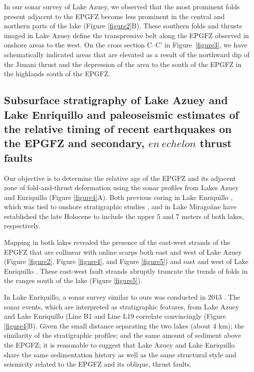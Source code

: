 \documentclass[linenumbers,draft]{agujournal}
\begin{document}
In our sonar survey of Lake Azuey, we observed that the most prominent folds present adjacent to the EPGFZ become less prominent in the central and northern parts of the lake (Figure \ref{figure2}B). These southern folds and thrusts imaged in Lake Azuey define the transpressive belt along the EPGFZ observed in onshore areas to the west. On the cross section C--C' in Figure~\ref{figure3}, we have schematically indicated areas that are elevated as a result of the northward dip of the Jimani thrust and the depression of the area to the south of the EPGFZ in the highlands south of the EPGFZ.

\subsection{Subsurface stratigraphy of Lake Azuey and Lake Enriquillo and paleoseismic estimates of the relative timing of recent earthquakes on the EPGFZ and secondary, $en~echelon$ thrust faults}
Our objective is to determine the relative age of the EPGFZ and its adjacent zone of fold-and-thrust deformation using the sonar profiles from Lakes Azuey and Enriquillo (Figure \ref{figure4}A). Both previous coring in Lake Enriquillo \citep{rios2013holocene}, which was tied to onshore stratigraphic studies \citep{taylor1985stratigraphy,rios2013holocene}, and in Lake Mirago\^ane \citep{higuera199910} have established the late Holocene to include the upper 5 and 7 meters of both lakes, respectively. 

Mapping in both lakes revealed the presence of the east-west strands of the EPGFZ that are collinear with online scarps both east and west of Lake Azuey (Figure \ref{figure2}, Figure \ref{figure4}, and Figure \ref{figure5}) and east and west of Lake Enriquillo \citep{mann1995actively,rios2013holocene}. These east-west fault strands abruptly truncate the trends of folds in the ranges south of the lake (Figure \ref{figure5}). 

In Lake Enriquillo, a sonar survey similar to ours was conducted in 2013 \citep{rios2013holocene}. The sonar events, which are interpreted as stratigraphic features, from Lake Azuey and Lake Enriquillo (Line B1 and Line L19 correlate convincingly (Figure \ref{figure4}B). Given the small distance separating the two lakes (about 4 km); the similarity of the stratigraphic profiles; and the same amount of sediment above the EPGFZ; it is reasonable to suggest that Lake Azuey and Lake Enriquillo share the same sedimentation history as well as the same structural style and seismicity related to the EPGFZ and its oblique, thrust faults.
\end{document}

